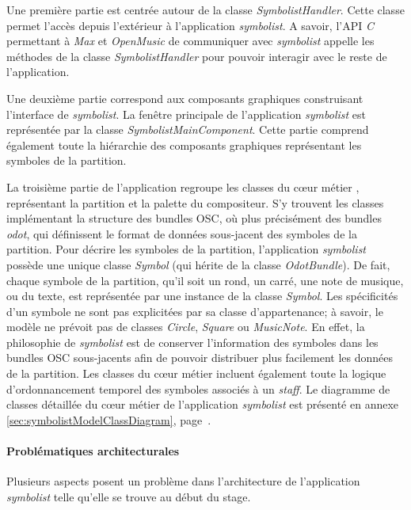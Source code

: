 Une première partie est centrée autour de la classe \textit{SymbolistHandler}. Cette classe permet l'accès depuis l'extérieur à l'application \textit{symbolist}. A savoir, l'API \textit{C} permettant à \textit{Max} et \textit{OpenMusic} de communiquer avec \textit{symbolist} appelle les méthodes de la classe \textit{SymbolistHandler} pour pouvoir interagir avec le reste de l'application.

Une deuxième partie correspond aux composants graphiques construisant l'interface de \textit{symbolist}. La fenêtre principale de l'application \textit{symbolist} est représentée par la classe \textit{SymbolistMainComponent}. Cette partie comprend également toute la hiérarchie des composants graphiques représentant les symboles de la partition.

La troisième partie de l'application regroupe les classes du \og cœur métier \fg, représentant la partition et la palette du compositeur. 
S'y trouvent les classes implémentant la structure des bundles OSC, où plus précisément des bundles \textit{odot}, qui définissent le format de données sous-jacent des symboles de la partition.
Pour décrire les symboles de la partition, l'application \textit{symbolist} possède une unique classe \textit{Symbol} (qui hérite de la classe \textit{OdotBundle}). De fait, chaque symbole de la partition, qu'il soit un rond, un carré, une note de musique, ou du texte, est représentée par une instance de la classe \textit{Symbol}. Les spécificités d'un symbole ne sont pas explicitées par sa classe d'appartenance; 
à savoir, le modèle ne prévoit pas de classes \textit{Circle}, \textit{Square} ou \textit{MusicNote}.
En effet, la philosophie de \textit{symbolist} est de conserver l'information des symboles dans les bundles OSC sous-jacents afin de pouvoir distribuer plus facilement les données de la partition.
Les classes du cœur métier incluent également toute la logique d'ordonnancement temporel des symboles associés à un \textit{staff}.
Le diagramme de classes détaillée du cœur métier de l'application \textit{symbolist} est présenté en annexe \ref{sec:symbolistModelClassDiagram}, page~\pageref{sec:symbolistModelClassDiagram}.

\paragraph{Problématiques architecturales} Plusieurs aspects posent un problème dans l'architecture de l'application \textit{symbolist} telle qu'elle se trouve au début du stage.

